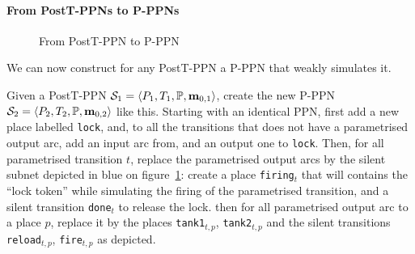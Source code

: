 
\paragraph{From PostT-PPNs to P-PPNs}
\label{sec:from-postt-ppn-to-p-ppn}

\begin{figure}[htbp]
  \centering
  
  \par
  \caption{From PostT-PPN to P-PPN}
  \label{fig:posttppn-to-pppn}
\end{figure}

We can now construct for any PostT-PPN a P-PPN that weakly simulates it.

Given a PostT-PPN $\namePPN[1] = \tuple{\places_1, \transitions_1, \parameters, \mar_{0,1}}$, create the new P-PPN $\namePPN[2] = \tuple{\places_2, \transitions_2, \parameters, \mar_{0,2}}$ like this.
Starting with an identical \ac{PPN}, first add a new place labelled \texttt{lock}, and, to all the transitions that does not have a parametrised output arc, add an input arc from, and an output one to \texttt{lock}.
Then, for all parametrised transition $t$, replace the parametrised output arcs by the silent subnet depicted in blue on figure~\ref{fig:posttppn-to-pppn}:
create a place \texttt{firing}$_t$ that will contains the ``lock token'' while simulating the firing of the parametrised transition, and a silent transition \texttt{done}$_t$ to release the lock.
then for all parametrised output arc to a place $p$, replace it by the places \texttt{tank1}$_{t,p}$, \texttt{tank2}$_{t,p}$ and the silent transitions \texttt{reload}$_{t,p}$, \texttt{fire}$_{t,p}$ as depicted.

